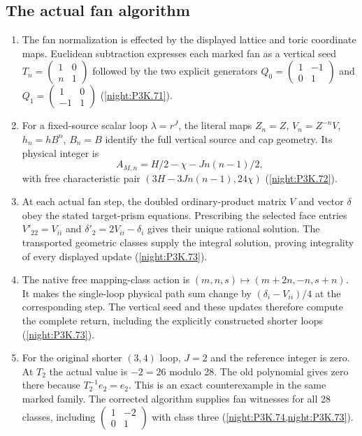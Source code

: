 \subsection{The actual fan algorithm}
\RungOne
\begin{enumerate}[label=\arabic*.]
\item The fan normalization is effected by the displayed lattice
  and toric coordinate maps.  Euclidean subtraction expresses each
  marked fan as a vertical seed
  $T_n=\left(\begin{smallmatrix}1&0\\n&1\end{smallmatrix}\right)$
  followed by the two explicit generators
  $Q_0=\left(\begin{smallmatrix}1&-1\\0&1\end{smallmatrix}\right)$
  and $Q_1=\left(\begin{smallmatrix}1&0\\-1&1\end{smallmatrix}\right)$
  (\cref{night:P3K.71}).
\item For a fixed-source scalar loop $\lambda=r^J$, the literal
  maps $Z_n=Z$, $V_n=Z^{-n}V$, $h_n=hB^n$, $B_n=B$ identify the
  full vertical source and cap geometry.  Its physical integer is
  \[
  A_{M,n}=H/2-\chi-Jn(n-1)/2,
  \]
  with free characteristic pair
  $(3H-3Jn(n-1),24\chi)$
  (\cref{night:P3K.72}).
\item At each actual fan step, the doubled ordinary-product
  matrix $V$ and vector $\delta$ obey the stated target-prism
  equations.  Prescribing the selected face entries
  $V'_{22}=V_{ii}$ and
  $\delta'_2=2V_{ii}-\delta_i$ gives their unique rational
  solution.  The transported geometric classes supply the integral
  solution, proving integrality of every displayed update
  (\cref{night:P3K.73}).
\item The native free mapping-class action is
  $(m,n,s)\mapsto(m+2n,-n,s+n)$.
  It makes the single-loop physical path sum change by
  $(\delta_i-V_{ii})/4$ at the corresponding step.  The vertical
  seed and these updates therefore compute the complete return,
  including the explicitly constructed shorter loops
  (\cref{night:P3K.73}).
\item For the original shorter $(3,4)$ loop, $J=2$ and the
  reference integer is zero.  At $T_2$ the actual value is $-2=26$
  modulo 28.  The old polynomial gives zero there because
  $T_2^{-1}e_2=e_2$.  This is an exact counterexample in the same
  marked family.  The corrected algorithm supplies fan witnesses
  for all 28 classes, including
  $\left(\begin{smallmatrix}1&-2\\0&1\end{smallmatrix}\right)$
  with class three (\cref{night:P3K.74,night:P3K.73}).
\end{enumerate}

